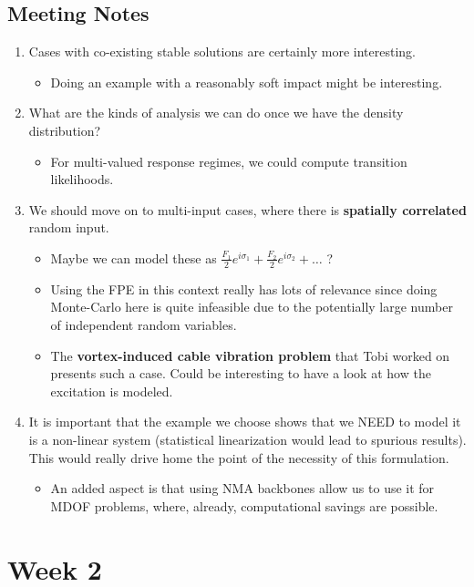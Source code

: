 \documentclass[11pt]{article}
\begin{document}
\subsection{Meeting Notes}
\label{sec:org7afa7b7}
\begin{enumerate}
\item Cases with co-existing stable solutions are certainly more interesting.
\begin{itemize}
\item Doing an example with a reasonably soft impact might be interesting.
\end{itemize}
\item What are the kinds of analysis we can do once we have the density distribution?
\begin{itemize}
\item For multi-valued response regimes, we could compute transition likelihoods.
\end{itemize}
\item We should move on to multi-input cases, where there is \textbf{spatially correlated} random input.
\begin{itemize}
\item Maybe we can model these as \(\frac{F_1}{2}e^{i\sigma_1}+\frac{F_2}{2}e^{i\sigma_2}+\dots\) ?
\item Using the FPE in this context really has lots of relevance since doing Monte-Carlo here is quite infeasible due to the potentially large number of independent random variables.
\item The \textbf{vortex-induced cable vibration problem} that Tobi worked on presents such a case. Could be interesting to have a look at how the excitation is modeled.
\end{itemize}
\item It is important that the example we choose shows that we NEED to model it is a non-linear system (statistical linearization would lead to spurious results). This would really drive home the point of the necessity of this formulation.
\begin{itemize}
\item An added aspect is that using NMA backbones allow us to use it for MDOF problems, where, already, computational savings are possible.
\end{itemize}
\end{enumerate}

\section{Week 2}
\label{sec:org0173fe1}
\end{document}
